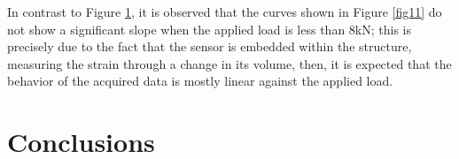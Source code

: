 \documentclass[twocolumn]{bmcart}%
\begin{document}
\begin{figure}[h!]
  \caption{
      }
      \label{fig13}
      \end{figure}



In contrast to Figure \ref{fig13}, it is observed that the curves shown in Figure \ref{fig11} do not show a significant slope when the applied load is less than 8kN; this is precisely due to the fact that the sensor is embedded within the structure, measuring the strain through a change in its volume, then, it is expected that the behavior of the acquired data is mostly linear against the applied load.



\section*{Conclusions}
\end{document}
